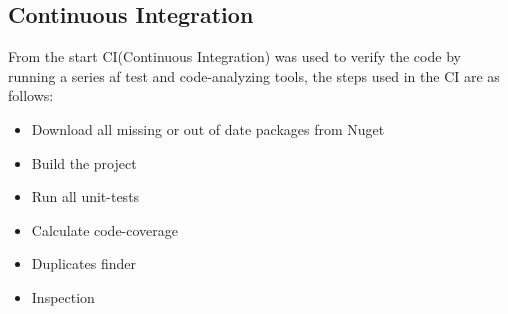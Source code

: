 \subsection{Continuous Integration}

From the start CI(Continuous Integration) was used to verify the code by running a series af test and code-analyzing tools, the steps used in the CI are as follows:

\begin{itemize}
	\item Download all missing or out of date packages from Nuget
	\item Build the project
	\item Run all unit-tests
	\item Calculate code-coverage
	\item Duplicates finder
	\item Inspection
\end{itemize}
